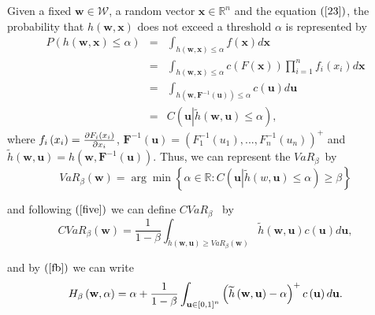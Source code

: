 \documentclass[a4paper,10pt]{article}
\begin{document}
Given a fixed $\mathbf{w\in }\mathcal{W}$, a random vector $\mathbf{x\in
	\mathbb{R}
}^{n}$ and the equation $\left( \ref{23}\right) $, the probability that $%
h\left( \mathbf{w,x}\right) $ does not exceed a threshold $\alpha $ is
represented by
\begin{eqnarray*}
	P\left( h\left( \mathbf{w,x}\right) \leq \alpha \right)  &=&\int_{h\left(
		\mathbf{w,x}\right) \leq \alpha }f\left( \mathbf{x}\right) d\mathbf{x} \\
	&=&\int_{h\left( \mathbf{w,x}\right) \leq \alpha }c\left( F\left( \mathbf{x}%
	\right) \right) \prod_{i=1}^{n}f_{i}\left( x_{i}\right) d\mathbf{x} \\
	&=&\int_{h\left( \mathbf{w,F}^{-1}\left( \mathbf{u}\right) \right) \leq
		\alpha }c\left( \mathbf{u}\right) d\mathbf{u} \\
	&=&C\left( \mathbf{u}\left\vert \widetilde{h}\left( \mathbf{w,u}\right) \leq
	\alpha \right. \right) ,
\end{eqnarray*}%
where $f_{i}\left( x_{i}\right) =\frac{\partial F_{i}\left( x_{i}\right) }{%
	\partial x_{i}}$, $\mathbf{F}^{-1}\left( \mathbf{u}\right) =\left(
F_{1}^{-1}\left( u_{1}\right) ,...,F_{n}^{-1}\left( u_{n}\right) \right) ^{+}
$ and $\widetilde{h}\left( \mathbf{w,u}\right) =h\left( \mathbf{w,F}%
^{-1}\left( \mathbf{u}\right) \right) .$ Thus, we can represent the $VaR_{\beta }$\thinspace\ by
\begin{equation}
VaR_{\beta }\left( \mathbf{w}\right) =\arg \min \left\{ \alpha \in
\mathbb{R}
:C\left( \mathbf{u}\left\vert \widetilde{h}\left( w\mathbf{,u}\right) \leq \alpha
\right. \right) \geq \beta \right\}  \label{25}
\end{equation}

and following $\left( \ref{five}\right) $ we can define $CVaR_{\beta }$%
\thinspace\ by%
\begin{equation}
CVaR_{\beta }\left( \mathbf{w}\right) =\frac{1}{1-\beta }\int_{\widetilde{h}\left(
	\mathbf{w,u}\right) \geq VaR_{\beta }\left( \mathbf{w}\right) }\widetilde{h}\left(
\mathbf{w,u}\right) c\left( \mathbf{u}\right) d\mathbf{u,}  \label{26}
\end{equation}

and by $\left( \ref{fb}\right) $ we can write
\begin{equation}
H_{\beta }\left( \mathbf{w},\alpha \right) =\alpha +\frac{1}{1-\beta }\int_{%
	\mathbf{u} \in \left[ 0,1\right] ^{n}}\left( \widetilde{h}\left( \mathbf{w,u}\right)
-\alpha \right) ^{+}c\left( \mathbf{u}\right) d\mathbf{u.}  \label{27}
\end{equation}
\end{document}
